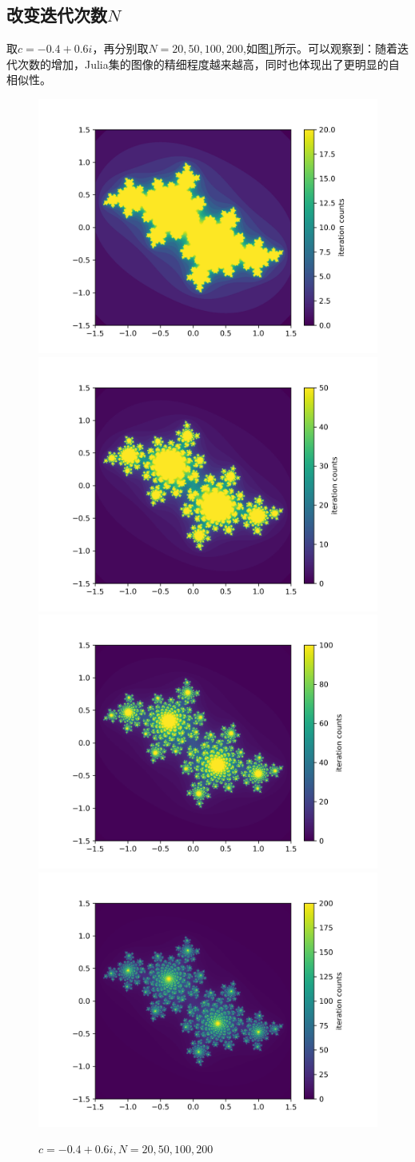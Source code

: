 \documentclass[a4paper]{ctexart}
\begin{document}
\subsection{改变迭代次数$N$}
取$c=-0.4+0.6i$\cite{julia_wiki}，再分别取$N=20,50,100,200$,如图\ref{tu2}所示。可以观察到：随着迭代次数的增加，Julia集的图像的精细程度越来越高，同时也体现出了更明显的自相似性。
\begin{figure}[H]
	\centering
	\includegraphics[width=.45\textwidth]{../png/300dpi/julia_cx-0.4cy0.6_N20.png}
	\includegraphics[width=.45\textwidth]{../png/300dpi/julia_cx-0.4cy0.6_N50.png}
	\includegraphics[width=.45\textwidth]{../png/300dpi/julia_cx-0.4cy0.6_N100.png}
	\includegraphics[width=.45\textwidth]{../png/300dpi/julia_cx-0.4cy0.6_N200.png}
	\caption{$c=-0.4+0.6i,N=20,50,100,200$}
	\label{tu2}
\end{figure}
\end{document}
